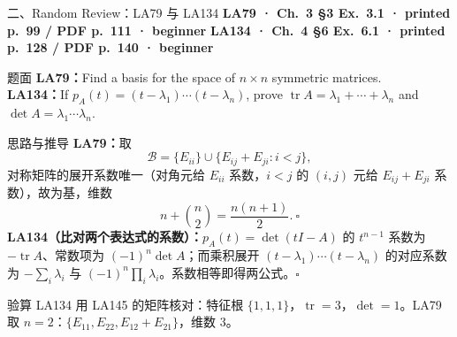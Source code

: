\documentclass[aspectratio=169,10pt,fontset=none]{ctexbeamer}
\newcommand{\ex}[1]{\textcolor{accent}{\footnotesize\bfseries #1}}
\begin{document}
\begin{frame}[t]{二、Random Review：LA79 与 LA134}
  \leavevmode\ex{LA79 · Ch.~3 §3 Ex.~3.1 · printed p.~99 / PDF p.~111 · beginner}\quad
  \ex{LA134 · Ch.~4 §6 Ex.~6.1 · printed p.~128 / PDF p.~140 · beginner}
  \begin{block}{\footnotesize 题面}
    \scriptsize \textbf{LA79：}Find a basis for the space of $n\times n$ symmetric matrices.\\
    \textbf{LA134：}If $p_A(t)=(t-\lambda_1)\cdots(t-\lambda_n)$, prove $\operatorname{tr}A=\lambda_1+\cdots+\lambda_n$ and $\det A=\lambda_1\cdots\lambda_n$.
  \end{block}
  \begin{exampleblock}{\footnotesize 思路与推导}
    \scriptsize
    \textbf{LA79：}取
    $$\mathcal B=\{E_{ii}\}\cup\{E_{ij}+E_{ji}:i<j\},$$
    对称矩阵的展开系数唯一（对角元给 $E_{ii}$ 系数，$i<j$ 的 $(i,j)$ 元给 $E_{ij}+E_{ji}$ 系数），故为基，维数
    $$n+\binom n2=\frac{n(n+1)}2.\ \square$$
    \textbf{LA134（比对两个表达式的系数）：}$p_A(t)=\det(tI-A)$ 的 $t^{n-1}$ 系数为 $-\operatorname{tr}A$、常数项为 $(-1)^n\det A$；而乘积展开 $(t-\lambda_1)\cdots(t-\lambda_n)$ 的对应系数为 $-\sum_i\lambda_i$ 与 $(-1)^n\prod_i\lambda_i$。系数相等即得两公式。$\square$
  \end{exampleblock}
  \begin{block}{\footnotesize 验算}
    \scriptsize LA134 用 LA145 的矩阵核对：特征根 $\{1,1,1\}$，$\operatorname{tr}=3$，$\det=1$。LA79 取 $n=2$：$\{E_{11},E_{22},E_{12}+E_{21}\}$，维数 $3$。
  \end{block}
\end{frame}
\end{document}
